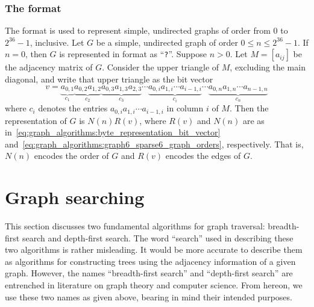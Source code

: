 
\subsubsection{The \graphsix format}
\index{\graphsix}

The \graphsix\index{\graphsix} format is used to represent simple,
undirected graphs of order from $0$ to $2^{36} - 1$, inclusive. Let
$G$ be a simple, undirected graph of order $0 \leq n \leq 2^{36} - 1$.
If $n = 0$, then $G$ is represented in \graphsix format as
``\verb!?!''. Suppose $n > 0$. Let $M = [a_{ij}]$ be the adjacency
matrix of $G$. Consider the upper
triangle of $M$, excluding the main
diagonal, and write that upper triangle as
the bit vector
\[
v
=
\underbrace{a_{0,1}}_{c_1}
\underbrace{a_{0,2} a_{1,2}}_{c_2}
\underbrace{a_{0,3} a_{1,3} a_{2,3}}_{c_3} \cdots
\underbrace{a_{0,i} a_{1,i} \cdots a_{i-1,i}}_{c_i} \cdots
\underbrace{a_{0,n} a_{1,n} \cdots a_{n-1,n}}_{c_n}
\]
where $c_i$ denotes the entries $a_{0,i} a_{1,i} \cdots a_{i-1,i}$ in
column $i$ of $M$. Then the \graphsix\index{\graphsix} representation
of $G$ is $N(n) R(v)$, where $R(v)$ and $N(n)$ are as
in~\eqref{eq:graph_algorithms:byte_representation_bit_vector}
and~\eqref{eq:graph_algorithms:graph6_sparse6_graph_orders},
respectively. That is, $N(n)$ encodes the order of $G$ and $R(v)$
encodes the edges of $G$.



\section{Graph searching}
\label{sec:graph_algorithms:graph_searching}

This section discusses two fundamental algorithms for graph
traversal: breadth-first
search and depth-first
search. The word ``search'' used in
describing these two algorithms is rather misleading. It would be more
accurate to describe them as algorithms for constructing trees using
the adjacency information of a given graph. However, the names
``breadth-first search'' and ``depth-first search'' are entrenched in
literature on graph theory and computer science. From hereon, we use
these two names as given above, bearing in mind their intended
purposes.


